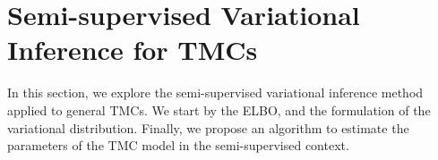 




\section{Semi-supervised Variational Inference for TMCs}
In this section, we explore the semi-supervised variational inference method
applied to  general TMCs.
We start by the ELBO, and the formulation of the variational
distribution. Finally, we propose an algorithm to estimate the parameters
of the TMC model in the semi-supervised context.

